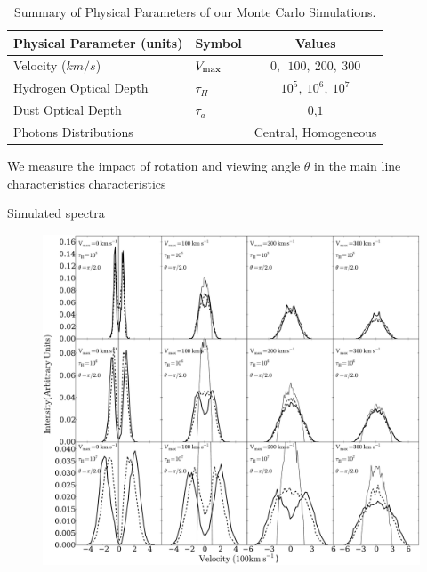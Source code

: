 \documentclass{beamer}
\begin{document}
\begin{frame}
\begin{table}
\begin{center}
\begin{tabular}{llc}\hline\hline
Physical Parameter (units) & Symbol & Values\\\hline
Velocity ($km/s$) & $V_{\rm max}$&$0,\ \ 100,\ 200,\ 300$\\
Hydrogen Optical Depth & $\tau_{H} $ & $10^{5},\ 10^{6},\ 10^{7}$\\
Dust Optical Depth & $\tau_{a}$ & $0$,$1$\\
Photons Distributions & & Central, Homogeneous\\\hline\hline
\end{tabular}
\caption{Summary of Physical Parameters of our Monte Carlo Simulations.}
\end{center}
\end{table}
\end{frame}



\begin{frame}
\LARGE{We measure the impact of rotation and viewing angle $\theta$ in the 
main line characteristics characteristics}
\end{frame}

\begin{frame}{Simulated spectra}
\begin{figure}
\includegraphics[scale=0.16]{Figures/f4.pdf}
\end{figure}
\end{frame}
\end{document}
